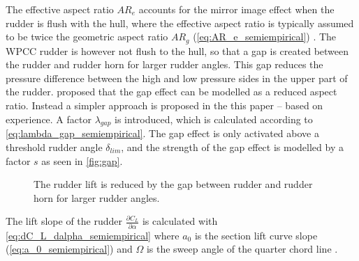 The effective aspect ratio $AR_e$ accounts for the mirror image effect when the rudder is flush with the hull, where the effective aspect ratio is typically assumed to be twice the geometric aspect ratio $AR_g$ (\autoref{eq:AR_e_semiempirical}) \citep{hughes_tempest_2011}.
The WPCC rudder is however not flush to the hull, so that a gap is created between the rudder and rudder horn for larger rudder angles. This gap reduces the pressure difference between the high and low pressure sides in the upper part of the rudder. \citet{matusiak_dynamics_2021} proposed that the gap effect can be modelled as a reduced aspect ratio. Instead a simpler approach is proposed in the this paper -- based on experience. A factor $\lambda_{gap}$ is introduced, which is calculated according to \autoref{eq:lambda_gap_semiempirical}. The gap effect is only activated above a threshold rudder angle $\delta_{lim}$, and the strength of the gap effect is modelled by a factor $s$ as seen in \autoref{fig:gap}.
\begin{equation}
    \label{eq:lambda_gap_semiempirical}
    
\end{equation}
\begin{figure}[h]
    \centering
    
    \caption{The rudder lift is reduced by the gap between rudder and rudder horn for larger rudder angles.}
    \label{fig:gap}
\end{figure}
The lift slope of the rudder $\frac{\partial C_L}{\partial \alpha}$ is calculated with \autoref{eq:dC_L_dalpha_semiempirical} where $a_0$ is the section lift curve slope (\autoref{eq:a_0_semiempirical}) and $\Omega$ is the sweep angle of the quarter chord line \citep{lewis_principles_1989}.
\begin{equation}
    \label{eq:dC_L_dalpha_semiempirical}
    
\end{equation}
%
\begin{equation}
    \label{eq:AR_e_semiempirical}
    
\end{equation}
%
\begin{equation}
    \label{eq:AR_g_semiempirical}
    
\end{equation}
%
\begin{equation}
    \label{eq:a_0_semiempirical}
    
\end{equation}
